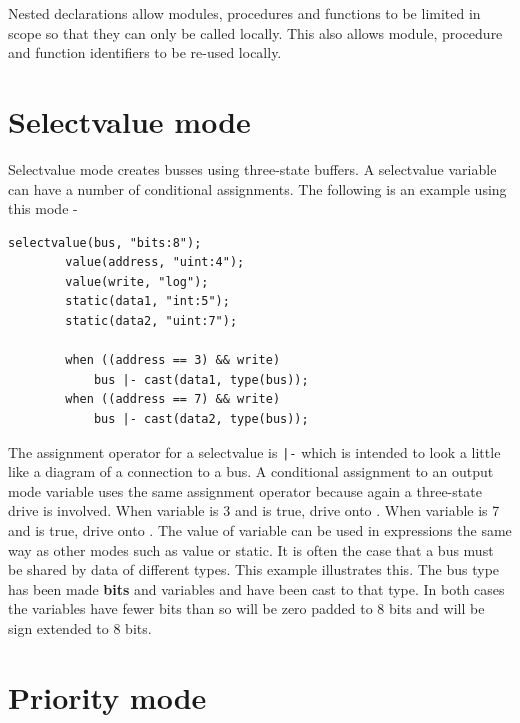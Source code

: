         Nested declarations allow modules, procedures and functions to be limited
        in scope so that they can only be called locally. This also allows
        module, procedure and function identifiers to be re-used locally.





    \section{Selectvalue mode}

        Selectvalue mode creates busses using three-state buffers. A selectvalue
        variable can have a number of conditional assignments. The following is an
        example using this mode -
        \pagebreak
        \begin{lstlisting}[language=threepl]
        selectvalue(bus, "bits:8");
        value(address, "uint:4");
        value(write, "log");
        static(data1, "int:5");
        static(data2, "uint:7");

        when ((address == 3) && write)
            bus |- cast(data1, type(bus));
        when ((address == 7) && write)
            bus |- cast(data2, type(bus));
        \end{lstlisting}
        The assignment operator for a selectvalue is \verb'|-' which is intended
        to look a little like a diagram of a connection to a bus. A conditional
        assignment to an output mode variable uses the same assignment operator
        because again a three-state drive is involved.
        When variable  is 3 and  is true, drive 
        onto .
        When variable  is 7 and  is true, drive 
        onto .
        The value of variable  can be used in expressions
        the same way as other modes such as value or static.
        It is often the case that a bus must be shared by data of different types.
        This example illustrates this. The bus type has been made {\bf bits} and
        variables  and  have been cast to that type. In both
        cases the variables have fewer bits than  so  will be
        zero padded to 8 bits and  will be sign extended to 8 bits.



    \section{Priority mode}

